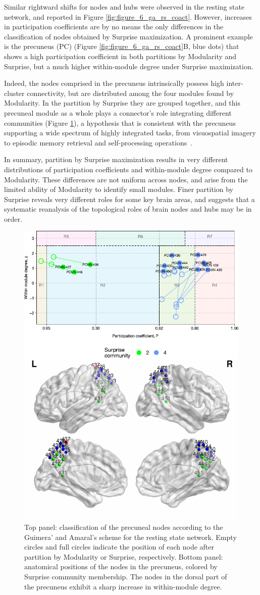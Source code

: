 Similar rightward shifts for nodes and hubs were observed in the resting state network, and reported in Figure \ref{fig:figure_6_ga_rs_coact}.
However, increases in participation coefficients are by no means the only differences in the classification of nodes obtained by Surprise maximization. A prominent example is the precuneus (PC) (Figure \ref{fig:figure_6_ga_rs_coact}B, blue dots) that shows a high participation coefficient in both partitions by Modularity and Surprise, but a much higher within-module degree under Surprise maximization.

Indeed, the nodes comprised in the precuneus intrinsically possess high inter-cluster connectivity, but are distributed among the four modules found by Modularity. In the partition by Surprise they are grouped together, and this precuneal module as a whole plays a connector's role integrating different communities (Figure \ref{fig:figure_8_ga_rs_precuneus}), a hypothesis that is consistent with the precuneus supporting a wide spectrum of highly integrated tasks, from visuospatial imagery to episodic memory retrieval and self-processing operations~\cite{cavanna2006}.

In summary, partition by Surprise maximization results in very different distributions of participation coefficients and within-module degree compared to Modularity. These differences are not uniform across nodes, and arise from the limited ability of Modularity to identify small modules. Finer partition by Surprise reveals very different roles for some key brain areas, and suggests that a systematic reanalysis of the topological roles of brain nodes and hubs may be in order.

\begin{figure}[htb!]
\centering
\includegraphics[width=0.5\linewidth]{images/figure_8_precuneus.pdf}
\caption{Top panel: classification of the precuneal nodes according to the Guimera' and Amaral's scheme for the resting state network. Empty circles and full circles indicate the position of each node after partition by Modularity or Surprise, respectively. Bottom panel: anatomical positions of the nodes in the precuneus, colored by Surprise community membership. The nodes in the dorsal part of the precuneus exhibit a sharp increase in within-module degree.}
\label{fig:figure_8_ga_rs_precuneus}
\end{figure}


